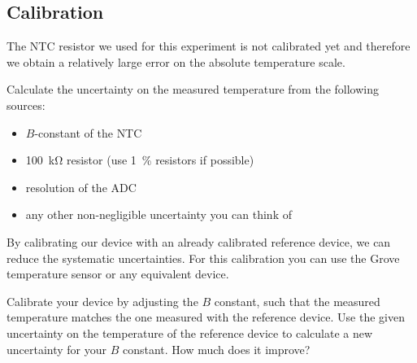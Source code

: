 \subsection{Calibration}\label{sec:calibration}
The \ac{NTC} resistor we used for this experiment is not calibrated yet and therefore we obtain a relatively large error on the absolute temperature scale.\par
%
\begin{task}
  Calculate the uncertainty on the measured temperature from the following sources:
  \begin{itemize}
      \item $B$-constant of the \ac{NTC}
      \item \SI{100}{\kilo\ohm} resistor (use \SI{1}{\percent} resistors if possible)
      \item resolution of the \ac{ADC}
      \item any other non-negligible uncertainty you can think of
  \end{itemize}
\end{task}
%
By calibrating our device with an already calibrated reference device, we can reduce the systematic uncertainties. For this calibration you can use the Grove temperature sensor or any equivalent device.\par
%
\begin{task}
  Calibrate your device by adjusting the $B$ constant, such that the measured temperature matches the one measured with the reference device. Use the given uncertainty on the temperature of the reference device to calculate a new uncertainty for your $B$ constant. How much does it improve?
\end{task}
%
